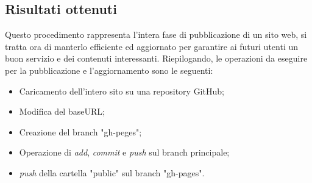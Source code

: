 \documentclass[target=bach,aauheader=]{thud}
\begin{document}
\subsection{Risultati ottenuti}
Questo procedimento rappresenta l'intera fase di pubblicazione di un sito web, si tratta ora di manterlo efficiente ed aggiornato per garantire ai futuri utenti un buon servizio e dei contenuti interessanti. 
Riepilogando, le operazioni da eseguire per la pubblicazione e l'aggiornamento sono le seguenti: 
\begin{itemize}
    \item Caricamento dell'intero sito su una repository GitHub;
    \item Modifica del baseURL;
    \item Creazione del branch "gh-peges";
    \item Operazione di \textit{add}, \textit{commit} e \textit{push} sul branch principale;
    \item \textit{push} della cartella "public" sul branch "gh-pages".
\end{itemize}

\end{document}
